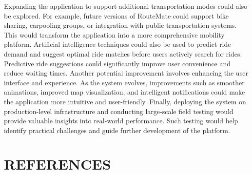 \documentclass[10pt,a4paper]{report}
\begin{document}
\justify\large Expanding the application to support additional transportation modes could also be explored. For example, future versions of RouteMate could support bike sharing, carpooling groups, or integration with public transportation systems. This would transform the application into a more comprehensive mobility platform.
\justify\large Artificial intelligence techniques could also be used to predict ride demand and suggest optimal ride matches before users actively search for rides. Predictive ride suggestions could significantly improve user convenience and reduce waiting times.
\justify\large Another potential improvement involves enhancing the user interface and experience. As the system evolves, improvements such as smoother animations, improved map visualization, and intelligent notifications could make the application more intuitive and user-friendly.
\justify\large Finally, deploying the system on production-level infrastructure and conducting large-scale field testing would provide valuable insights into real-world performance. Such testing would help identify practical challenges and guide further development of the platform.



\newpage

\chapter*{REFERENCES}
\end{document}
